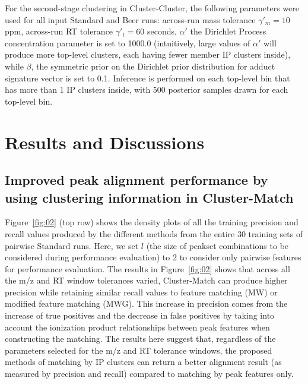 
For the second-stage clustering in Cluster-Cluster, the following parameters were used for all input Standard and Beer runs: across-run mass tolerance $\gamma'_m=10$ ppm, across-run RT tolerance $\gamma'_t=60$ seconds, $\alpha'$ the Dirichlet Process concentration parameter is set to 1000.0 (intuitively, large values of $\alpha'$ will produce more top-level clusters, each having fewer member IP clusters inside), while $\beta$, the symmetric prior on the Dirichlet prior distribution for adduct signature vector is set to 0.1. Inference is performed on each top-level bin that has more than 1 IP clusters inside, with 500 posterior samples drawn for each top-level bin.

\section{Results and Discussions}

\subsection{Improved peak alignment performance by using clustering information in Cluster-Match}

Figure~\ref{fig:02} (top row) shows the density plots of all the training precision and recall values produced by the different methods from the entire 30 training sets of pairwise Standard runs. Here, we set $l$ (the size of peakset combinations to be considered during performance evaluation) to 2 to consider only pairwise features for performance evaluation. The results in Figure~\ref{fig:02} shows that across all the m/z and RT window tolerances varied, Cluster-Match can produce higher precision while retaining similar recall values to feature matching (MW) or modified feature matching (MWG). This increase in precision comes from the increase of true positives and the decrease in false positives by taking into account the ionization product relationships between peak features when constructing the matching. The results here suggest that, regardless of the parameters selected for the m/z and RT tolerance windows, the proposed methods of matching by IP clusters can return a better alignment result (as measured by precision and recall) compared to matching by peak features only.


